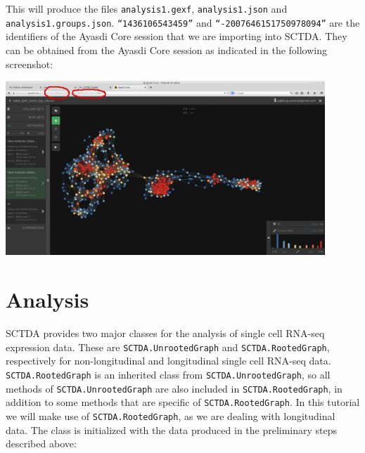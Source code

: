 \documentclass[letterpaper,10pt,english]{/usr/share/sphinx/texinputs/sphinxhowto}
\begin{document}
This will produce the files \texttt{analysis1.gexf}, \texttt{analysis1.json} and
\texttt{analysis1.groups.json}. \texttt{``1436106543459''} and \texttt{``-2007646151750978094''}
are the identifiers of the Ayasdi Core session that we are importing
into SCTDA. They can be obtained from the Ayasdi Core session as
indicated in the following screenshot:
\begin{center}
\includegraphics[width = 120mm]{figs/f3.jpg}    
\end{center}

\section{Analysis}

SCTDA provides two major classes for the analysis of single cell RNA-seq
expression data. These are \texttt{SCTDA.UnrootedGraph} and \texttt{SCTDA.RootedGraph},
respectively for non-longitudinal and longitudinal single cell RNA-seq
data. \texttt{SCTDA.RootedGraph} is an inherited class from \texttt{SCTDA.UnrootedGraph},
so all methods of \texttt{SCTDA.UnrootedGraph} are also included in
\texttt{SCTDA.RootedGraph}, in addition to some methods that are specific of
\texttt{SCTDA.RootedGraph}. In this tutorial we will make use of
\texttt{SCTDA.RootedGraph}, as we are dealing with longitudinal data. The class
is initialized with the data produced in the preliminary steps described
above:

\end{document}
